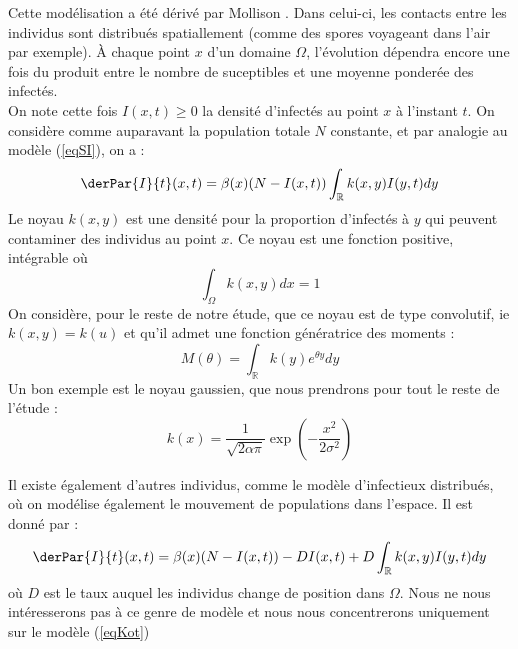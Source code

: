 \documentclass{article}
\begin{document}
\bigskip
Cette modélisation a été dérivé par Mollison \cite{mollison1972}. Dans celui-ci, les contacts entre les individus sont distribués spatiallement (comme des spores voyageant dans l'air par exemple). À chaque point $x$ d'un domaine $\Omega$, l'évolution dépendra encore une fois du produit entre le nombre de suceptibles et une moyenne ponderée des infectés.\\
On note cette fois $I(x,t)\geq 0$ la densité d'infectés au point $x$ à l'instant $t$. On considère comme auparavant la population totale $N$ constante, et par analogie au modèle (\ref{eqSI}), on a :
\begin{equation} \label{eqKot}
	\derPar{I}{t}(x,t)=\beta(x)(N-I(x,t))\int_{\mathbb{R}}k(x,y)I(y,t) dy
\end{equation}
Le noyau $k(x,y)$ est une densité pour la proportion d'infectés à $y$ qui peuvent contaminer des individus au point $x$. Ce noyau est une fonction positive, intégrable où \[\int_\Omega k(x,y) dx=1\]
On considère, pour le reste de notre étude, que ce noyau est de type convolutif, ie $k(x,y)=k(u)$ et qu'il admet une fonction génératrice des moments :
	\[M(\theta)=\int_{\mathbb{R}} k(y)e^{\theta y} dy\]
Un bon exemple est le noyau gaussien, que nous prendrons pour tout le reste de l'étude :
\begin{equation}\label{noyGau}
	k(x)=\frac{1}{\sqrt{2\alpha\pi}} \exp\left(-\frac{x^2}{2\sigma^2} \right)
\end{equation}

\bigskip
Il existe également d'autres individus, comme le modèle d'infectieux distribués, où on modélise également le mouvement de populations dans l'espace. Il est donné par :
\begin{equation}
	\derPar{I}{t}(x,t)=\beta(x)(N-I(x,t))-DI(x,t)+D\int_{\mathbb{R}}k(x,y)I(y,t) dy
\end{equation}
où $D$ est le taux auquel les individus change de position dans $\Omega$. Nous ne nous intéresserons pas à ce genre de modèle et nous nous concentrerons uniquement sur le modèle (\ref{eqKot})
\end{document}
